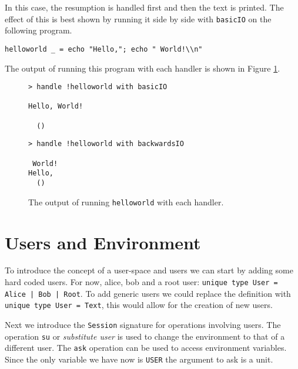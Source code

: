 \documentclass[logo,bsc,singlespacing,parskip]{infthesis}
\begin{document}
In this case, the resumption is handled first and then the text is printed. The
effect of this is best shown by running it side by side with \texttt{basicIO}
on the following program.

\begin{lstlisting}[language=unison]
helloworld _ = echo "Hello,"; echo " World!\\n"
\end{lstlisting}

The output of running this program with each handler is shown in Figure \ref{fig:sidebyside}.

\begin{figure}[h]
  \label{fig:sidebyside}
\begin{minipage}{0.5\textwidth}

\begin{lstlisting}[style=terminal]
> handle !helloworld with basicIO

Hello, World!

  ()
\end{lstlisting}

\end{minipage}%
\begin{minipage}{0.5\textwidth}

\begin{lstlisting}[style=terminal]
 > handle !helloworld with backwardsIO

 World!
Hello,
  ()
\end{lstlisting}
\end{minipage}
\caption{The output of running \texttt{helloworld} with each handler.}
\end{figure}

\section{Users and Environment}

To introduce the concept of a user-space and users we can start by adding some
hard coded users. For now, alice, bob and a root user: \texttt{unique type User
= Alice | Bob | Root}. To add generic users we could replace the definition with 
\texttt{unique type User = Text}, this would allow for the creation of new users.

Next we introduce the \texttt{Session} signature for operations involving
users. The operation \texttt{su} or \emph{substitute user} is used to change
the environment to that of a different user. The \texttt{ask} operation can be
used to access environment variables. Since the only variable we have now is
\texttt{USER} the argument to ask is a unit.
\end{document}
